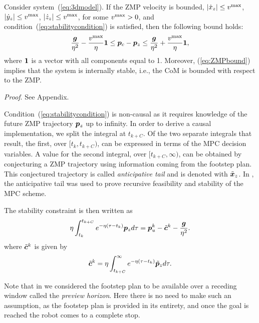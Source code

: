 \medskip

\begin{proposition}
Consider system~(\ref{eq:3dmodel}). If the ZMP velocity is bounded, 
$|\dot x_z|\le v^{\rm max}$, $|\dot y_z|\le v^{\rm max}$, $|\dot z_z|\le v^{\rm max}$, for some $v^{\rm max}>0$, and condition~(\ref{eq:stabilitycondition}) is satisfied, then the following bound holds:
\begin{equation}
\label{eq:ZMPbound}
\frac{{\bm{g}}}{\eta^2}- \frac{v^{\rm max}}{\eta}{\bf 1} \le {\bm{p}}_c-{\bm{p}}_z \le \frac{{\bm{g}}}{\eta^2}+\frac{v^{\rm max}}{\eta}{\bf 1},
\end{equation}
where ${\bf 1}$ is a vector with all components equal to 1. Moreover, (\ref{eq:ZMPbound}) implies that the system is internally stable, i.e., the CoM is bounded with respect to the ZMP.
\label{prop:velocityBound}
\end{proposition}

\medskip

\emph{Proof}. See Appendix.

\medskip

Condition~(\ref{eq:stabilitycondition}) is non-causal as it requires knowledge of the future ZMP trajectory ${\bm{p}}_z$ up to infinity. In order to derive a causal implementation, we split the integral at $t_{k+C}$. Of the two separate integrals that result, the first, over $[t_k, t_{k+C})$, can be expressed in terms of the MPC decision variables. A value for the second integral, over $[t_{k+C}, \infty)$, can be obtained by conjecturing a ZMP trajectory using information coming from the footstep plan.
This conjectured trajectory is called \emph{anticipative tail} and is denoted with $\tilde {{\bm{x}}}_z$. 
In \cite{ScDeLaOr:20}, the anticipative tail was used to prove recursive feasibility and stability of the MPC scheme.

The stability constraint is then written as
\begin{equation}\label{eq:stability_constraint}
\eta\int_{t_k}^{t_{k+C}}e^{-\eta(\tau - t_k)}{\bm{p}}_z d\tau = {\bm{p}}_u^k - \tilde {{\bm{c}}}^k - \frac{{\bm{g}}}{\eta^2}.
\end{equation}
where $\tilde {{\bm{c}}}^k$ is given by
\begin{equation}%
\tilde\bfc^k = \eta\int_{t_{k+C}}^{\infty}e^{-\eta(\tau - t_k)}\tilde\bfp_z d\tau.
\end{equation}

Note that in \cite{ScDeLaOr:20} we considered the footstep plan to be available over a receding window called the \emph{preview horizon}. Here there is no need to make such an assumption, as the footstep plan is provided in its entirety, and once the goal is reached the robot comes to a complete stop.

